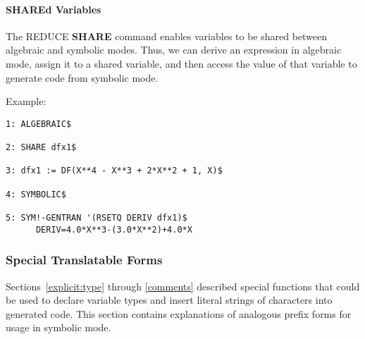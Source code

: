 \paragraph{SHAREd Variables}
\label{share} 
The REDUCE {\bf SHARE} command enables variables to be shared
between algebraic and symbolic modes.  Thus, we can derive an expression in
algebraic mode, assign it to a shared variable, and then access the value
of that variable to generate code from symbolic mode.

\begin{describe}{Example:}
\begin{verbatim}
1: ALGEBRAIC$

2: SHARE dfx1$

3: dfx1 := DF(X**4 - X**3 + 2*X**2 + 1, X)$

4: SYMBOLIC$

5: SYM!-GENTRAN '(RSETQ DERIV dfx1)$
      DERIV=4.0*X**3-(3.0*X**2)+4.0*X
\end{verbatim}
\end{describe} 

\subsubsection{Special Translatable Forms}
\label{special}
Sections~\ref{explicit:type} through \ref{comments} described special
functions that could be used to declare variable types and insert
literal strings of characters into generated code.  This section
contains explanations of analogous prefix forms for usage in symbolic
mode.

